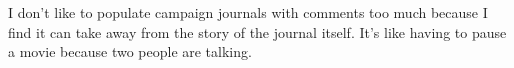 I don't like to populate campaign journals with comments too much because I find it can take away from the story of the journal itself. It's like having to pause a movie because two people are talking.\\


